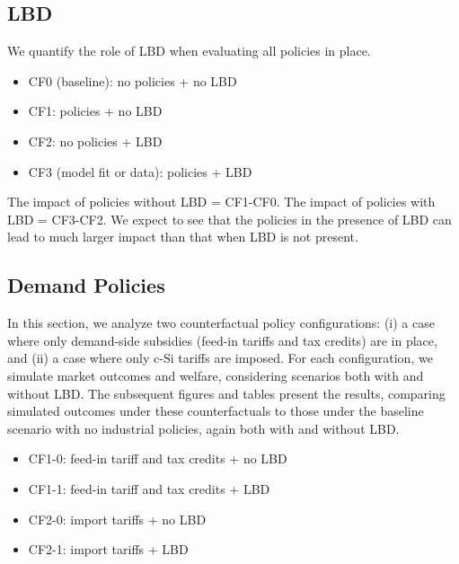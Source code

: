 \documentclass[12pt, letter]{article}
\begin{document}
\subsection{LBD}
We quantify the role of LBD when evaluating all policies in place.
\begin{itemize}
    \item CF0 (baseline): no policies + no LBD
    \item CF1: policies + no LBD
    \item CF2: no policies + LBD
    \item CF3 (model fit or data): policies + LBD
\end{itemize} 

The impact of policies without LBD = CF1-CF0.
The impact of policies with LBD = CF3-CF2.
We expect to see that the policies in the presence of LBD can lead to much larger impact than that when LBD is not present.


\subsection{Demand Policies}
\label{subsec:cf_demand}
In this section, we analyze two counterfactual policy configurations: (i)  a case where only demand-side subsidies (feed-in tariffs and tax credits) are in place, and (ii) a case where only c-Si tariffs are imposed. For each configuration, we simulate market outcomes and welfare, considering scenarios both with and without LBD. The subsequent figures and tables present the results, comparing simulated outcomes under these counterfactuals to those under the baseline scenario with no industrial policies, again both with and without LBD.

\begin{itemize}
    \item CF1-0: feed-in tariff and tax credits + no LBD
    \item CF1-1: feed-in tariff and tax credits + LBD
    \item CF2-0: import tariffs + no LBD
    \item CF2-1: import tariffs + LBD
\end{itemize} 
\end{document}
